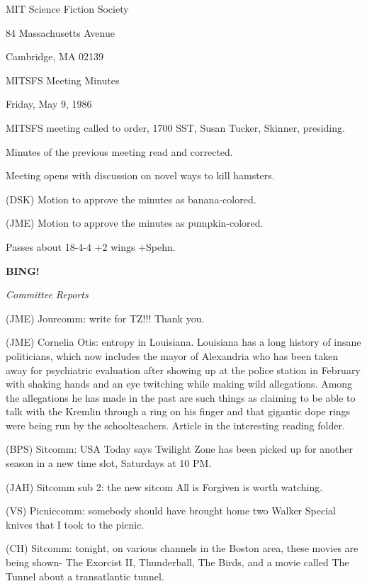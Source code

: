 \documentclass[12pt]{article}
\newcommand{\bing}{{\bf BING!} }
\newcommand{\goto}[1]{\bing \vskip 12pt \centerline{{\em{#1}}}}
\begin{document}
\begin{center}

MIT Science Fiction Society 

84 Massachusetts Avenue

Cambridge, MA 02139

\vspace{12pt}

MITSFS Meeting Minutes 

Friday, May 9, 1986

\end{center}
 
\vspace{18pt}

\setlength{\parskip}{6pt}

\noindent
MITSFS meeting called to order, 1700 SST,
Susan Tucker, Skinner, presiding.

Minutes of the previous meeting read and corrected.

Meeting opens with discussion on novel ways to kill hamsters.

(DSK) Motion to approve the minutes as banana-colored.

(JME) Motion to approve the minutes as pumpkin-colored.

Passes about 18-4-4 +2 wings +Spehn.

\goto{Committee Reports}

(JME) Jourcomm: write for TZ!!! Thank you.

(JME) Cornelia Otis: entropy in Louisiana. Louisiana has a long history of insane politicians, which now includes the mayor of Alexandria who has been taken away for psychiatric evaluation after showing up at the police station in February with shaking hands and an eye twitching while making wild allegations. Among the allegations he has made in the past are such things as claiming to be able to talk with the Kremlin through a ring on his finger and that gigantic dope rings were being run by the schoolteachers. Article in the interesting reading folder.

(BPS) Sitcomm: USA Today says Twilight Zone has been picked up for another season in a new time slot, Saturdays at 10 PM.

(JAH) Sitcomm sub 2: the new sitcom All is Forgiven is worth watching.

(VS) Picniccomm: somebody should have brought home two Walker Special knives that I took to the picnic.

(CH) Sitcomm: tonight, on various channels in the Boston area, these movies are being shown- The Exorcist II, Thunderball, The Birds, and a movie called The Tunnel about a transatlantic tunnel.
\end{document}
